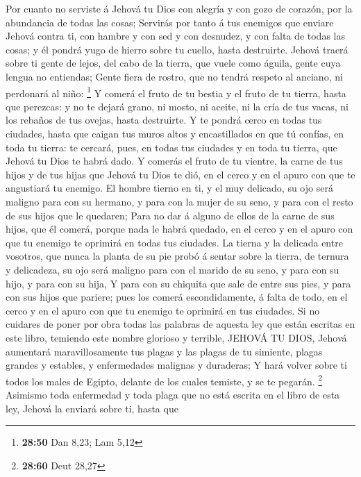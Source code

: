 Por cuanto no serviste á Jehová tu Dios con alegría y con
gozo de corazón, por la abundancia de todas las cosas; 
Servirás por tanto á tus enemigos que enviare Jehová contra ti, con
hambre y con sed y con desnudez, y con falta de todas las cosas; y él
pondrá yugo de hierro sobre tu cuello, hasta destruirte. 
Jehová traerá sobre ti gente de lejos, del cabo de la tierra, que vuele
como águila, gente cuya lengua no entiendas;  Gente fiera
de rostro, que no tendrá respeto al anciano, ni perdonará al niño:
\footnote{\textbf{28:50} Dan 8,23; Lam 5,12}  Y comerá el
fruto de tu bestia y el fruto de tu tierra, hasta que perezcas: y no te
dejará grano, ni mosto, ni aceite, ni la cría de tus vacas, ni los
rebaños de tus ovejas, hasta destruirte.  Y te pondrá cerco
en todas tus ciudades, hasta que caigan tus muros altos y encastillados
en que tú confías, en toda tu tierra: te cercará, pues, en todas tus
ciudades y en toda tu tierra, que Jehová tu Dios te habrá dado.
 Y comerás el fruto de tu vientre, la carne de tus hijos y
de tus hijas que Jehová tu Dios te dió, en el cerco y en el apuro con
que te angustiará tu enemigo.  El hombre tierno en ti, y el
muy delicado, su ojo será maligno para con su hermano, y para con la
mujer de su seno, y para con el resto de sus hijos que le quedaren;
 Para no dar á alguno de ellos de la carne de sus hijos,
que él comerá, porque nada le habrá quedado, en el cerco y en el apuro
con que tu enemigo te oprimirá en todas tus ciudades.  La
tierna y la delicada entre vosotros, que nunca la planta de su pie probó
á sentar sobre la tierra, de ternura y delicadeza, su ojo será maligno
para con el marido de su seno, y para con su hijo, y para con su hija,
 Y para con su chiquita que sale de entre sus pies, y para
con sus hijos que pariere; pues los comerá escondidamente, á falta de
todo, en el cerco y en el apuro con que tu enemigo te oprimirá en tus
ciudades.  Si no cuidares de poner por obra todas las
palabras de aquesta ley que están escritas en este libro, temiendo este
nombre glorioso y terrible, JEHOVÁ TU DIOS,  Jehová
aumentará maravillosamente tus plagas y las plagas de tu simiente,
plagas grandes y estables, y enfermedades malignas y duraderas;
 Y hará volver sobre ti todos los males de Egipto, delante
de los cuales temiste, y se te pegarán. \footnote{\textbf{28:60} Deut
  28,27}  Asimismo toda enfermedad y toda plaga que no está
escrita en el libro de esta ley, Jehová la enviará sobre ti, hasta que
